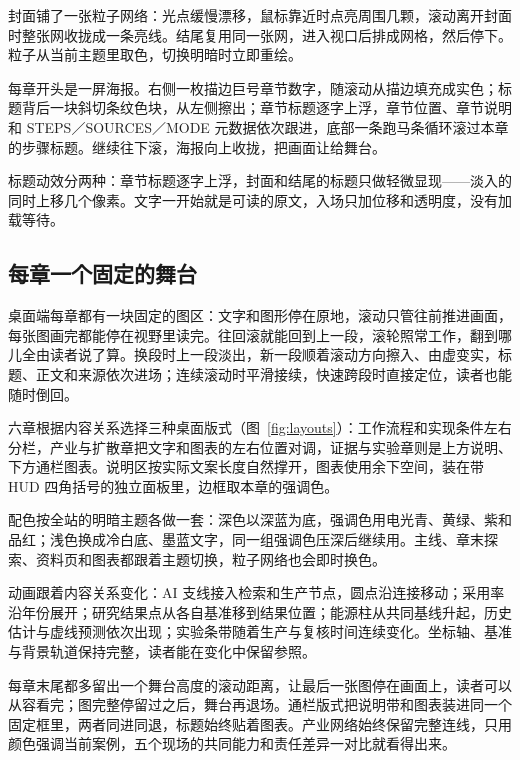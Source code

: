 \documentclass[UTF8,a4paper,11pt,fontset=fandol]{ctexart}
\begin{document}
封面铺了一张粒子网络：光点缓慢漂移，鼠标靠近时点亮周围几颗，滚动离开封面时整张网收拢成一条亮线。结尾复用同一张网，进入视口后排成网格，然后停下。粒子从当前主题里取色，切换明暗时立即重绘。

每章开头是一屏海报。右侧一枚描边巨号章节数字，随滚动从描边填充成实色；标题背后一块斜切条纹色块，从左侧擦出；章节标题逐字上浮，章节位置、章节说明和 STEPS／SOURCES／MODE 元数据依次跟进，底部一条跑马条循环滚过本章的步骤标题。继续往下滚，海报向上收拢，把画面让给舞台。

标题动效分两种：章节标题逐字上浮，封面和结尾的标题只做轻微显现——淡入的同时上移几个像素。文字一开始就是可读的原文，入场只加位移和透明度，没有加载等待。

\subsection{每章一个固定的舞台}

桌面端每章都有一块固定的图区：文字和图形停在原地，滚动只管往前推进画面，每张图画完都能停在视野里读完。往回滚就能回到上一段，滚轮照常工作，翻到哪儿全由读者说了算。换段时上一段淡出，新一段顺着滚动方向擦入、由虚变实，标题、正文和来源依次进场；连续滚动时平滑接续，快速跨段时直接定位，读者也能随时倒回。

六章根据内容关系选择三种桌面版式（图~\ref{fig:layouts}）：工作流程和实现条件左右分栏，产业与扩散章把文字和图表的左右位置对调，证据与实验章则是上方说明、下方通栏图表。说明区按实际文案长度自然撑开，图表使用余下空间，装在带 HUD 四角括号的独立面板里，边框取本章的强调色。

配色按全站的明暗主题各做一套：深色以深蓝为底，强调色用电光青、黄绿、紫和品红；浅色换成冷白底、墨蓝文字，同一组强调色压深后继续用。主线、章末探索、资料页和图表都跟着主题切换，粒子网络也会即时换色。

动画跟着内容关系变化：AI 支线接入检索和生产节点，圆点沿连接移动；采用率沿年份展开；研究结果点从各自基准移到结果位置；能源柱从共同基线升起，历史估计与虚线预测依次出现；实验条带随着生产与复核时间连续变化。坐标轴、基准与背景轨道保持完整，读者能在变化中保留参照。

每章末尾都多留出一个舞台高度的滚动距离，让最后一张图停在画面上，读者可以从容看完；图完整停留过之后，舞台再退场。通栏版式把说明带和图表装进同一个固定框里，两者同进同退，标题始终贴着图表。产业网络始终保留完整连线，只用颜色强调当前案例，五个现场的共同能力和责任差异一对比就看得出来。
\end{document}
